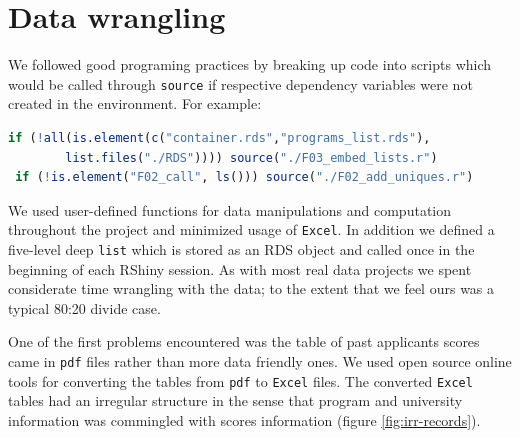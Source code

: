 \documentclass{article}
\begin{document}
\section{Data wrangling}

 We followed good programing practices by breaking up code into scripts which would be called through \texttt{source} if respective dependency variables were not created in the environment. For example:
 \begin{lstlisting}[language=R]
 if (!all(is.element(c("container.rds","programs_list.rds"), 
 		list.files("./RDS")))) source("./F03_embed_lists.r")
 if (!is.element("F02_call", ls())) source("./F02_add_uniques.r")
 \end{lstlisting}
 
We used user-defined functions for data manipulations and computation throughout the project and minimized usage of \texttt{Excel}. In addition we defined a five-level deep \texttt{list} which is stored as an RDS object and called once in the beginning of each RShiny session. As with most real data projects we spent considerate time wrangling with the data; to the extent that we feel ours was a typical 80:20 divide case.

One of the first problems encountered was the table of past applicants scores came in \texttt{pdf} files rather than more data friendly ones. We used open source online tools for converting the tables from \texttt{pdf} to \texttt{Excel} files. The converted \texttt{Excel} tables had an irregular structure in the sense that program and university information was commingled with scores information (figure \ref{fig:irr-records}).
\end{document}
